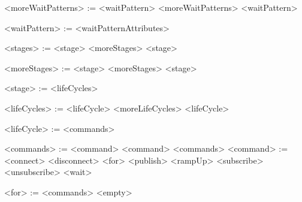 \begin{grammar}
	<moreWaitPatterns> := <waitPattern> <moreWaitPatterns>
						\alt <waitPattern>
						
	<waitPattern>	:= <waitPatternAttributes>

	<stages> := <stage> <moreStages>
				\alt <stage>
				
	<moreStages> := <stage> <moreStages>
				\alt <stage>
					
	<stage>		:= <lifeCycles>
	
	<lifeCycles> := <lifeCycle> <moreLifeCycles>
				
	<lifeCycle>  := <commands>
	
	<commands> := <command>
				\alt <command> <commands>
	<command> := <connect> \alt <disconnect> \alt <for> \alt <publish> \alt <rampUp> \alt <subscribe> \alt <unsubscribe> \alt <wait>
	
	<for> := <commands> \alt <empty>
\end{grammar}